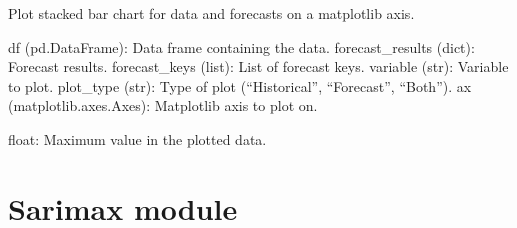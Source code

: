 \documentclass[letterpaper,10pt,english]{sphinxmanual}
\begin{document}
\begin{fulllineitems}
\label{\detokenize{Plotting:Plotting.plot_data_stacked_bar}}
\pysigstartsignatures
{}
\pysigstopsignatures
\sphinxAtStartPar
Plot stacked bar chart for data and forecasts on a matplotlib axis.
\begin{description}
\sphinxAtStartPar
df (pd.DataFrame): Data frame containing the data.
forecast\_results (dict): Forecast results.
forecast\_keys (list): List of forecast keys.
variable (str): Variable to plot.
plot\_type (str): Type of plot (“Historical”, “Forecast”, “Both”).
ax (matplotlib.axes.Axes): Matplotlib axis to plot on.

\sphinxAtStartPar
float: Maximum value in the plotted data.

\end{description}

\end{fulllineitems}


\sphinxstepscope


\section{Sarimax module}
\label{\detokenize{Sarimax:module-Sarimax}}\label{\detokenize{Sarimax:sarimax-module}}\label{\detokenize{Sarimax::doc}}
\end{document}

